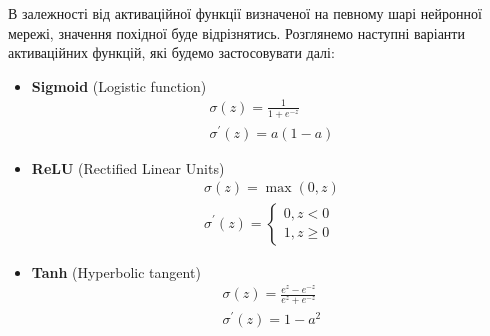 \documentclass[14pt,a4paper]{extarticle}
\newcounter{e}
\numberwithin{equation}{section}
\numberwithin{figure}{section}
\begin{document}
	В залежності від активаційної функції визначеної на певному шарі нейронної мережі, значення похідної буде відрізнятись. Розглянемо наступні варіанти активаційних функцій, які будемо застосовувати далі:
	\begin{itemize}	
		\item \textbf{Sigmoid} (Logistic function)
		\label{eq:sigmoid}
		\begin{equation}
			\begin{array}{l}
				\displaystyle
				\sigma(z)=\frac{1}{1+e^{-z}} \\[0.5cm]

				\displaystyle
				\sigma^{\prime}(z)=a(1-a)
			\end{array}
		\end{equation}
		
		\item \textbf{ReLU} (Rectiﬁed Linear Units)
		\begin{equation}
			\label{eq:relu}
			\begin{array}{l}
				\displaystyle
				\sigma(z)=\max (0, z) \\[0.5cm]

				\displaystyle
				\sigma^{\prime}(z)=\left\{\begin{array}{l}
					0, z<0 \\
					1, z \geq 0
				\end{array}\right.
			\end{array}
		\end{equation}
		
		\item \textbf{Tanh} (Hyperbolic tangent)
		\begin{equation}
			\label{eq:tanh}
			\begin{array}{l}
				\displaystyle
				\sigma(z)=\frac{e^{z}-e^{-z}}{e^{z}+e^{-z}} \\[0.5cm]
				
				\displaystyle
				\sigma^{\prime}(z)=1-a^{2}
			\end{array}
		\end{equation}
	\end{itemize}
		
\end{document}
